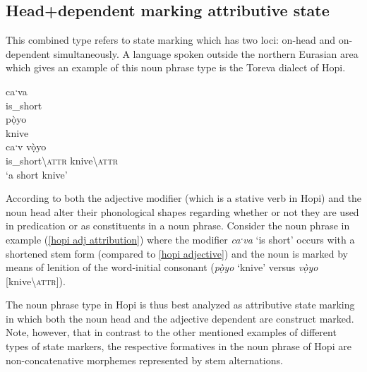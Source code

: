 \subsection{Head+dependent marking attributive state}
This combined type refers to state marking which has two loci: on-head and on-dependent simultaneously. A language spoken outside the northern Eurasian area which gives an example of this noun phrase type is the Toreva dialect of Hopi.
\begin{exe}
\ex 
{}
\begin{xlist}
\ex	\label{hopi adjective}
\gll caˑva\\
	is\_short\\
\ex	
\gll pọ̀yo\\
	knive\\
\ex	\label{hopi adj attribution}
\gll caˑv vọ̀yo\\
 	is\_short\textbackslash\textsc{attr} knive\textbackslash\textsc{attr}\\
\glt	‘a short knive’
\end{xlist}
\end{exe}
According to \citet[178]{whorf1946} both the adjective modifier (which is a stative verb in Hopi) and the noun head alter their phonological shapes regarding whether or not they are used in predication or as constituents in a noun phrase. Consider the noun phrase in example (\ref{hopi adj attribution}) where the modifier \textit{caˑva} ‘is short’ occurs with a shortened stem form (compared to \ref{hopi adjective}) and the noun is marked by means of lenition of the word-initial consonant (\textit{pọ̀yo} ‘knive’ versus \textit{vọ̀yo} [knive\textbackslash\textsc{attr}]).

The noun phrase type in Hopi is thus best analyzed as attributive state marking in which both the noun head and the adjective dependent are construct marked. Note, however, that in contrast to the other mentioned examples of different types of state markers, the respective formatives in the noun phrase of Hopi are non-concatenative morphemes represented by stem alternations.

